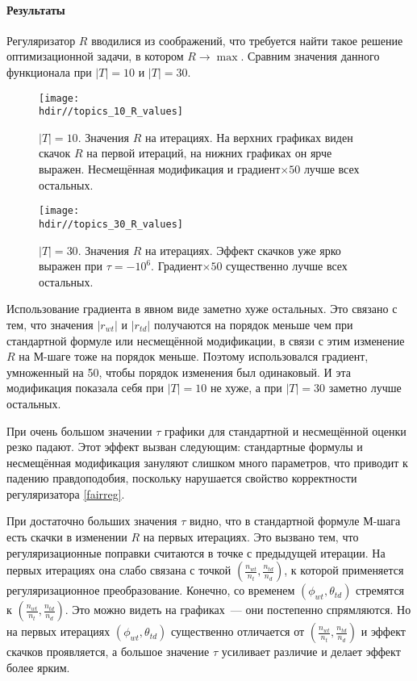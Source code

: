 \documentclass[12pt, twoside]{article}
\newcommand{\hdir}{.}
\begin{document}
\paragraph{Результаты}

Регуляризатор $R$  вводилися из соображений, что требуется найти такое решение оптимизационной задачи, в котором $R \to \max$. Сравним значения данного функционала при $|T| = 10$ и $|T| = 30$.

\begin{figure}[!ht]
	\centering
	\texttt{[image: \\hdir//topics\_10\_R\_values]}
	\caption{$|T| = 10$. Значения $R$ на итерациях. На верхних графиках виден скачок $R$ на первой итераций, на нижних графиках он ярче выражен. Несмещённая модификация и градиент${\times}50$  лучше всех остальных.}
\end{figure}

\begin{figure}[!ht]
	\centering  
	\texttt{[image: \\hdir//topics\_30\_R\_values]}
	\caption{$|T| = 30$. Значения $R$ на итерациях.  Эффект скачков уже ярко выражен при $\tau = -10^6$. Градиент${\times}50$ существенно лучше всех остальных.}  
\end{figure}

Использование градиента в явном виде заметно хуже остальных. Это связано с тем, что значения $|r_{wt}|$ и $|r_{td}|$ получаются на порядок меньше чем при стандартной формуле или несмещённой модификации, в связи с этим изменение $R$ на М-шаге тоже на порядок меньше. Поэтому использовался градиент, умноженный на 50, чтобы порядок изменения был одинаковый. И эта модификация показала себя при $|T| = 10$ не хуже, а при $|T| = 30$ заметно лучше остальных.

При очень большом значении $\tau$ графики для стандартной и несмещённой оценки резко падают. Этот эффект вызван следующим: стандартные формулы и несмещённая модификация зануляют слишком много параметров, что приводит к падению правдоподобия, поскольку нарушается свойство корректности регуляризатора \ref{fairreg}.

При достаточно больших значения $\tau$ видно, что в стандартной  формуле М-шага есть скачки в изменении $R$ на первых итерациях. Это вызвано тем, что регуляризационные поправки считаются в точке с предыдущей итерации. На первых итерациях  она слабо связана с точкой $\left( \frac{n_{wt}}{{n_t}}, \frac{n_{td}}{n_d}\right)$, к которой применяется регуляризационное преобразование. Конечно, со временем $(\phi_{wt}, \theta_{td})$ стремятся к $\left( \frac{n_{wt}}{{n_t}}, \frac{n_{td}}{n_d}\right)$. Это можно видеть на графиках~--- они постепенно спрямляются. Но на первых итерациях $(\phi_{wt}, \theta_{td})$ существенно отличается  от $\left( \frac{n_{wt}}{{n_t}}, \frac{n_{td}}{n_d}\right)$  и эффект скачков  проявляется, а большое значение $\tau$ усиливает различие и делает эффект более ярким.
\end{document}
